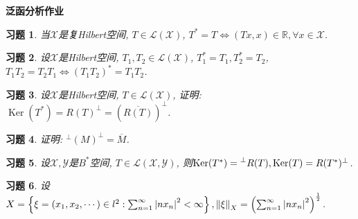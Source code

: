 \documentclass[a4paper,oneside,12pt]{ctexart}
\theoremstyle{plain}
\newtheorem{exercise}{习题}
\theoremstyle{nonumberplain}
\theoremstyle{nonumberplain}
\newcommand{\R}{\mathbb{R}}
\newcommand{\sX}{\mathscr{X}}
\newcommand{\sY}{\mathscr{Y}}
\newcommand{\sL}{\mathscr{L}}
\newcommand{\leftperp}{\prescript{\perp}{}}
\DeclareMathOperator{\Ker}{Ker}
\begin{document}
    
    \begin{center}
        \bfseries\LARGE
        泛函分析作业
    \end{center}

    \begin{exercise}
        \label{ex:1 on note}
        当$\sX$是复Hilbert空间, $T\in\sL(\sX)$, $T^\ast=T\Leftrightarrow (Tx,x)\in\R,\forall x\in\sX$.
    \end{exercise}

    \begin{exercise}
        \label{ex:2 on note}
        设$\sX$是Hilbert空间, $T_1,T_2\in\sL(\sX)$, $T_1^\ast=T_1,T_2^\ast=T_2$, $T_1T_2=T_2T_1\Leftrightarrow (T_1T_2)^\ast=T_1T_2$.
    \end{exercise}

    \begin{exercise}
        \label{ex:3 on note}
        设$\sX$是Hilbert空间, $T\in\sL(\sX)$, 证明: $\Ker(T^\ast)=R(T)^\perp=\left(\overline{R(T)}\right)^\perp$.
    \end{exercise}

    \begin{exercise}
        \label{ex:4 on note}
        证明: $^\perp(M)^\perp=\overline{M}$.
    \end{exercise}

    \begin{exercise}
        \label{ex:5 on note}
        设$\sX,\sY$是$B^\ast$空间, $T\in\sL(\sX,\sY)$, 则$\Ker(T^\ast)=\leftperp R(T),\Ker(T)=R(T^\ast)^\perp$.
    \end{exercise}

    \begin{exercise}
        \label{ex:6 on note}
        设$X=\left\{\xi=(x_1,x_2,\cdots)\in l^2:\sum_{n=1}^\infty\abs{nx_n}^2<\infty\right\},\norm{\xi}_X=\left(\sum_{n=1}^\infty \abs{nx_n}^2\right)^{\frac{1}{2}}$.
    \end{exercise}
\end{document}

